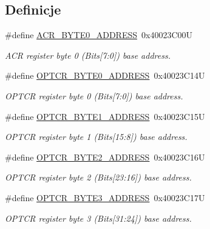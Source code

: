\subsection*{Definicje}
\begin{DoxyCompactItemize}
\item 
\#define \hyperlink{group___f_l_a_s_h___private___constants_gaeaca61fbcff69df08100280868bff214}{A\+C\+R\+\_\+\+B\+Y\+T\+E0\+\_\+\+A\+D\+D\+R\+E\+SS}~0x40023\+C00U
\begin{DoxyCompactList}\small\item\em A\+CR register byte 0 (Bits\mbox{[}7\+:0\mbox{]}) base address. \end{DoxyCompactList}\item 
\#define \hyperlink{group___f_l_a_s_h___private___constants_ga8223df020203a97af44e4b14e219d01e}{O\+P\+T\+C\+R\+\_\+\+B\+Y\+T\+E0\+\_\+\+A\+D\+D\+R\+E\+SS}~0x40023\+C14U
\begin{DoxyCompactList}\small\item\em O\+P\+T\+CR register byte 0 (Bits\mbox{[}7\+:0\mbox{]}) base address. \end{DoxyCompactList}\item 
\#define \hyperlink{group___f_l_a_s_h___private___constants_ga3c08568a9b3a9d213a70eff8e87117ac}{O\+P\+T\+C\+R\+\_\+\+B\+Y\+T\+E1\+\_\+\+A\+D\+D\+R\+E\+SS}~0x40023\+C15U
\begin{DoxyCompactList}\small\item\em O\+P\+T\+CR register byte 1 (Bits\mbox{[}15\+:8\mbox{]}) base address. \end{DoxyCompactList}\item 
\#define \hyperlink{group___f_l_a_s_h___private___constants_ga600e8029b876676da246a62924a294c7}{O\+P\+T\+C\+R\+\_\+\+B\+Y\+T\+E2\+\_\+\+A\+D\+D\+R\+E\+SS}~0x40023\+C16U
\begin{DoxyCompactList}\small\item\em O\+P\+T\+CR register byte 2 (Bits\mbox{[}23\+:16\mbox{]}) base address. \end{DoxyCompactList}\item 
\#define \hyperlink{group___f_l_a_s_h___private___constants_gab0cdb1b585010a65ca09ecf67055fb94}{O\+P\+T\+C\+R\+\_\+\+B\+Y\+T\+E3\+\_\+\+A\+D\+D\+R\+E\+SS}~0x40023\+C17U
\begin{DoxyCompactList}\small\item\em O\+P\+T\+CR register byte 3 (Bits\mbox{[}31\+:24\mbox{]}) base address. \end{DoxyCompactList}\end{DoxyCompactItemize}


